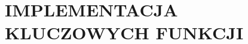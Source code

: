\section{IMPLEMENTACJA KLUCZOWYCH FUNKCJI}



\FloatBarrier



\FloatBarrier



\FloatBarrier



\FloatBarrier



\FloatBarrier



\FloatBarrier
